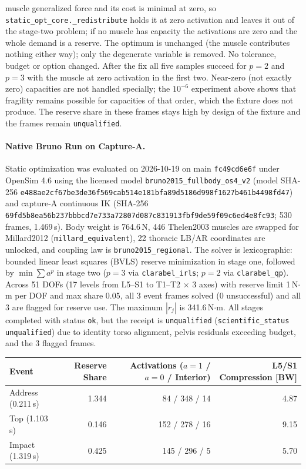 muscle generalized force and its cost is minimal at zero, so
\texttt{static\_opt\_core.\_redistribute} holds it at zero activation and
leaves it out of the stage-two problem; if no muscle has capacity the
activations are zero and the whole demand is a reserve. The optimum is
unchanged (the muscle contributes nothing either way); only the degenerate
variable is removed. No tolerance, budget or option changed. After the fix all
five samples succeed for $p=2$ and $p=3$ with the muscle at zero activation in
the first two. Near-zero (not exactly zero) capacities are not handled
specially; the $10^{-6}$ experiment above shows that fragility remains
possible for capacities of that order, which the fixture does not produce.
The reserve share in these frames stays high by design of the fixture and the
frames remain \texttt{unqualified}.

\paragraph{Native Bruno Run on Capture-A.}
Static optimization was evaluated on 2026-10-19 on main \texttt{fc49cd6e6f}
under OpenSim 4.6 using the licensed model \texttt{bruno2015\_fullbody\_os4\_v2}
(model SHA-256
\texttt{e488ae2cf67be3de36f569cab514e181bfa89d5186d998f1627b461b4498fd47})
and capture-A continuous IK (SHA-256
\texttt{69fd5b8ea56b237bbbcd7e733a72807d087c831913fbf9de59f09c6ed4e8fc93};
530 frames, 1.469\,s). Body weight is 764.6\,N, 446 Thelen2003 muscles are
swapped for Millard2012 (\texttt{millard\_equivalent}), 22 thoracic LB/AR
coordinates are unlocked, and coupling law is \texttt{bruno2015\_regional}.
The solver is lexicographic: bounded linear least squares (BVLS) reserve
minimization in stage one, followed by $\min \sum a^p$ in stage two ($p=3$ via
\texttt{clarabel\_irls}; $p=2$ via \texttt{clarabel\_qp}). Across 51 DOFs (17
levels from L5--S1 to T1--T2 $\times$ 3 axes) with reserve limit 1\,N$\cdot$m per
DOF and max share 0.05, all 3 event frames solved (0 unsuccessful) and all 3 are
flagged for reserve use. The maximum $|r_j|$ is 341.6\,N$\cdot$m. All stages
completed with status \texttt{ok}, but the receipt is \texttt{unqualified}
(\texttt{scientific\_status unqualified}) due to identity torso alignment, pelvis
residuals exceeding budget, and the 3 flagged frames.

\begin{center}
\begin{tabular}{lrrr}
\hline
Event & Reserve Share & Activations ($a=1$ / $a=0$ / Interior) & L5/S1 Compression [BW] \\
\hline
Address (0.211\,s) & 1.344 & 84 / 348 / 14 & 4.87 \\
Top (1.103\,s)     & 0.146 & 152 / 278 / 16 & 9.15 \\
Impact (1.319\,s)  & 0.425 & 145 / 296 / 5  & 5.70 \\
\hline
\end{tabular}
\end{center}

